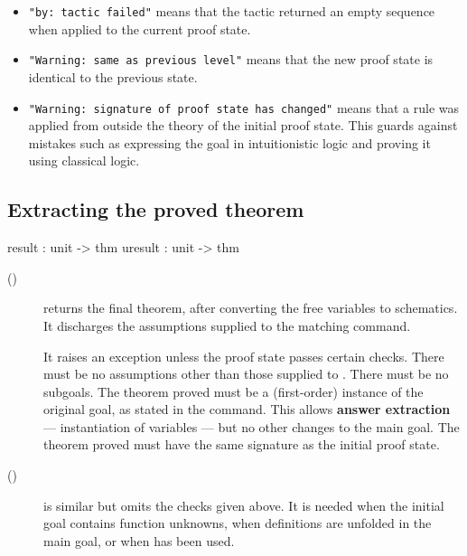 \begin{itemize}
\item 
{\tt "by:\ tactic failed"} means that the tactic returned an empty
sequence when applied to the current proof state. 
\item 
{\tt "Warning:\ same as previous level"} means that the new proof state
is identical to the previous state.
\item
{\tt "Warning:\ signature of proof state has changed"} means that a rule
was applied from outside the theory of the initial proof state.  This
guards against mistakes such as expressing the goal in intuitionistic logic
and proving it using classical logic.
\end{itemize}

\subsection{Extracting the proved theorem}
\begin{ttbox} 
result  : unit -> thm
uresult : unit -> thm
\end{ttbox}
\begin{description}
\item[()] 
returns the final theorem, after converting the free variables to
schematics.  It discharges the assumptions supplied to the matching 
 command.  

It raises an exception unless the proof state passes certain checks.  There
must be no assumptions other than those supplied to .  There
must be no subgoals.  The theorem proved must be a (first-order) instance
of the original goal, as stated in the  command.  This allows
{\bf answer extraction} --- instantiation of variables --- but no other
changes to the main goal.  The theorem proved must have the same signature
as the initial proof state.

\item[()] 
is similar but omits the checks given above.  It is needed when the initial
goal contains function unknowns, when definitions are unfolded in the main
goal, or when  has been used.
\end{description}


